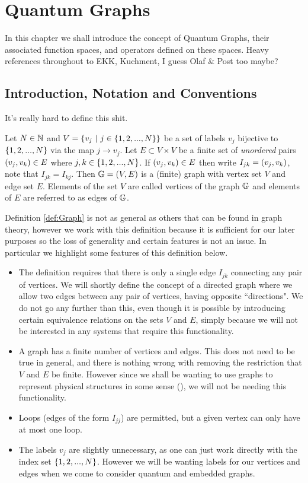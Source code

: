 \chapter{Quantum Graphs} \label{ch:QuantumGraphs}
In this chapter we shall introduce the concept of Quantum Graphs, their associated function spaces, and operators defined on these spaces.
Heavy references throughout to EKK, Kuchment, I guess Olaf \& Post too maybe?

\section{Introduction, Notation and Conventions}
It's really hard to define this shit.

\begin{definition}[Graph] \label{def:Graph}
	Let $N\in\mathbb{N}$ and $V=\clbracs{v_j \ \vert \ j\in\clbracs{1,2,...,N}}$ be a set of labels $v_j$ bijective to $\left\{ 1,2,...,N \right\}$ via the map $j\rightarrow v_j$.
	Let $E\subset V\times V$ be a finite set of \textit{unordered} pairs $\left( v_j,v_k \right)\in E$ where $j,k\in\left\{ 1,2,...,N \right\}$.
	If $\left( v_j,v_k \right)\in E$ then write $I_{jk} = \left( v_j,v_k \right)$, note that $I_{jk}=I_{kj}$.
	Then $\mathbb{G}=\left( V,E \right)$ is a (finite) graph with vertex set $V$ and edge set $E$.
	Elements of the set $V$ are called vertices of the graph $\mathbb{G}$ and elements of $E$ are referred to as edges of $\mathbb{G}$.	
\end{definition}
Definition \ref{def:Graph} is not as general as others that can be found in graph theory, however we work with this definition because it is sufficient for our later purposes so the loss of generality and certain features is not an issue.
In particular we highlight some features of this definition below.
\begin{itemize}
	\item The definition requires that there is only a single edge $I_{jk}$ connecting any pair of vertices.
	We will shortly define the concept of a directed graph where we allow two edges between any pair of vertices, having opposite ``directions".
	We do not go any further than this, even though it is possible by introducing certain equivalence relations on the sets $V$ and $E$, simply because we will not be interested in any systems that require this functionality. 
	\item A graph has a finite number of vertices and edges.
	This does not need to be true in general, and there is nothing wrong with removing the restriction that $V$ and $E$ be finite.
	However since we shall be wanting to use graphs to represent physical structures in some sense (), we will not be needing this functionality.
	\item Loops (edges of the form $I_{jj}$) are permitted, but a given vertex can only have at most one loop.
	\item The labels $v_j$ are slightly unnecessary, as one can just work directly with the index set $\left\{ 1,2,...,N \right\}$.
	However we will be wanting labels for our vertices and edges when we come to consider quantum and embedded graphs.
\end{itemize}

